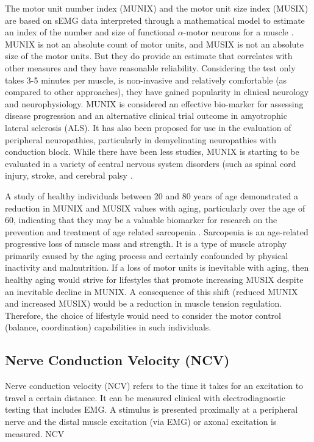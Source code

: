 The motor unit number index (MUNIX) and the motor unit size index (MUSIX) are based on sEMG data interpreted through a mathematical model to estimate an index of the number and size of functional $\alpha$-motor neurons for a muscle \cite{nandedkar_motor_2004}. MUNIX is not an absolute count of motor units, and MUSIX is not an absolute size of the motor units. But they do provide an estimate that correlates with other measures and they have reasonable reliability. Considering the test only takes 3-5 minutes per muscle, is non-invasive and relatively comfortable (as compared to other approaches), they have gained popularity in clinical neurology and neurophysiology. MUNIX is considered an effective bio-marker for assessing disease progression and an alternative clinical trial outcome in amyotrophic lateral sclerosis (ALS). It has also been proposed for use in the evaluation of peripheral neuropathies, particularly in demyelinating neuropathies with conduction block. While there have been less studies, MUNIX is starting to be evaluated in a variety of central nervous system disorders (such as spinal cord injury, stroke, and cerebral palsy \cite{fatehi_utility_2018}. 

A study of healthy individuals between 20 and 80 years of age demonstrated a reduction in MUNIX and MUSIX values with aging, particularly over the age of 60, indicating that they may be a valuable biomarker for research on the prevention and treatment of age related sarcopenia \cite{cao_reference_2020}. Sarcopenia is an age-related progressive loss of muscle mass and strength. It is a type of muscle atrophy primarily caused by the aging process and certainly confounded by physical inactivity and malnutrition. If a loss of motor units is inevitable with aging, then healthy aging would strive for lifestyles that promote increasing MUSIX despite an inevitable decline in MUNIX. A consequence of this shift (reduced MUNIX and increased MUSIX) would be a reduction in muscle tension regulation. Therefore, the choice of lifestyle would need to consider the motor control (balance, coordination) capabilities in such individuals.

\subsection{Nerve Conduction Velocity (NCV)}

Nerve conduction velocity (NCV) refers to the time it takes for an excitation to travel a certain distance. It can be measured clinical with electrodiagnostic testing that includes EMG. A stimulus is presented proximally at a peripheral nerve and the distal muscle excitation (via EMG) or axonal excitation is measured. NCV

